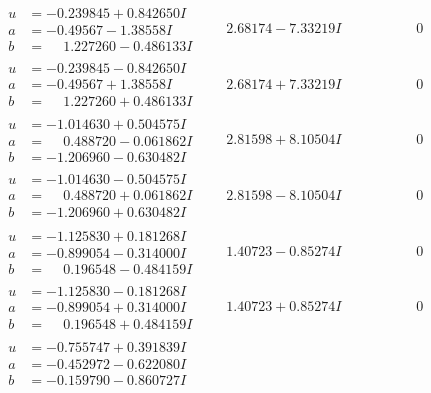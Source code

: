 \documentclass[1p]{elsarticle_modified}
\theoremstyle{definition}
\begin{document}
$$\begin{array}{c|c|c}
\begin{aligned}
u &= -0.239845 + 0.842650 I \\
a &= -0.49567 - 1.38558 I \\
b &= \phantom{-}1.227260 - 0.486133 I\end{aligned}
 & \phantom{-}2.68174 - 7.33219 I & \phantom{-0.000000 } 0 \\ \hline\begin{aligned}
u &= -0.239845 - 0.842650 I \\
a &= -0.49567 + 1.38558 I \\
b &= \phantom{-}1.227260 + 0.486133 I\end{aligned}
 & \phantom{-}2.68174 + 7.33219 I & \phantom{-0.000000 } 0 \\ \hline\begin{aligned}
u &= -1.014630 + 0.504575 I \\
a &= \phantom{-}0.488720 - 0.061862 I \\
b &= -1.206960 - 0.630482 I\end{aligned}
 & \phantom{-}2.81598 + 8.10504 I & \phantom{-0.000000 } 0 \\ \hline\begin{aligned}
u &= -1.014630 - 0.504575 I \\
a &= \phantom{-}0.488720 + 0.061862 I \\
b &= -1.206960 + 0.630482 I\end{aligned}
 & \phantom{-}2.81598 - 8.10504 I & \phantom{-0.000000 } 0 \\ \hline\begin{aligned}
u &= -1.125830 + 0.181268 I \\
a &= -0.899054 - 0.314000 I \\
b &= \phantom{-}0.196548 - 0.484159 I\end{aligned}
 & \phantom{-}1.40723 - 0.85274 I & \phantom{-0.000000 } 0 \\ \hline\begin{aligned}
u &= -1.125830 - 0.181268 I \\
a &= -0.899054 + 0.314000 I \\
b &= \phantom{-}0.196548 + 0.484159 I\end{aligned}
 & \phantom{-}1.40723 + 0.85274 I & \phantom{-0.000000 } 0 \\ \hline\begin{aligned}
u &= -0.755747 + 0.391839 I \\
a &= -0.452972 - 0.622080 I \\
b &= -0.159790 - 0.860727 I\end{aligned}

\end{array}$$
\end{document}

